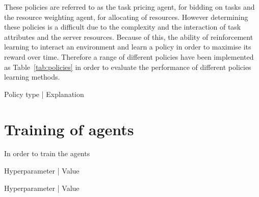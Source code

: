 These policies are referred to as the task pricing agent, for bidding on tasks and the resource weighting agent,
for allocating of resources. However determining these policies is a difficult due to the complexity and the interaction
of task attributes and the server resources. Because of this, the ability of reinforcement learning to interact
an environment and learn a policy in order to maximise its reward over time. Therefore a range of different
policies have been implemented as Table~\ref{tab:policies} in order to evaluate the performance of different policies
learning methods.

\begin{tabular}
    \begin{table}
        Policy type | Explanation \\
    \end{table}
    \label{tab:policies}
    \caption{Table of policy types}
\end{tabular}

\section{Training of agents}\label{sec:training-of-agents}
In order to train the agents

\begin{tabular}
    \begin{table}
        Hyperparameter | Value \\
    \end{table}
    \label{tab:dqn_hyperparameter}
    \caption{Table of Deep Q Networks training hyperparameters}
\end{tabular}

\begin{tabular}
    \begin{table}
        Hyperparameter | Value \\
    \end{table}
    \label{tab:ddpg_hyperparameter}
    \caption{Table of Deep Deterministic Policy Gradient hyperparameters}
\end{tabular}